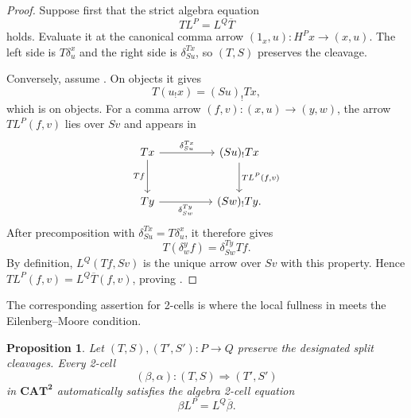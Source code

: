 \documentclass[11pt]{article}
\theoremstyle{plain}
\newtheorem{proposition}[theorem]{Proposition}
\theoremstyle{definition}
\theoremstyle{remark}
\newcommand{\CAT}{\mathbf{CAT}}
\numberwithin{equation}{section}
\begin{document}
\begin{proof}
Suppose first that the strict algebra equation
\begin{equation}
TL^{P}=L^{Q}\overline T
  \label{eq:TL-equality}
\end{equation}
holds.  Evaluate it at the canonical comma arrow
$(1_x,u)\colon H^{P}x\to(x,u)$.  The left side is
$T\delta^{x}_{u}$ and the right side is
$\delta^{Tx}_{Su}$, so $(T,S)$ preserves the cleavage.

Conversely, assume .  On objects it
gives
\begin{equation*}
T(u_{!}x)=(Su)_{!}Tx,
\end{equation*}
which is  on objects.  For a comma arrow
$(f,v)\colon(x,u)\to(y,w)$, the arrow $TL^{P}(f,v)$ lies over $Sv$
and appears in
\begin{equation*}
\begin{tikzcd}[column sep=huge,row sep=large]
Tx \arrow[r,"\delta^{Tx}_{Su}"] \arrow[d,"Tf"']
& (Su)_!Tx \arrow[d,"{TL^P(f,v)}"] \\
Ty \arrow[r,"\delta^{Ty}_{Sw}"']
& (Sw)_!Ty .
\end{tikzcd}
\end{equation*}
After precomposition with $\delta^{Tx}_{Su}=T\delta^{x}_{u}$, it
therefore gives
\begin{equation*}
T(\delta^{y}_{w}f)=\delta^{Ty}_{Sw}Tf.
\end{equation*}
By definition, $L^{Q}(Tf,Sv)$ is the unique arrow over $Sv$ with
this property.  Hence $TL^{P}(f,v)=L^{Q}\overline T(f,v)$, proving
.
\end{proof}

The corresponding assertion for 2-cells is where the local fullness
in  meets the Eilenberg--Moore condition.

\begin{proposition}\label{prop:two-cells}
Let $(T,S),(T',S')\colon P\to Q$ preserve the designated split
cleavages.  Every 2-cell
\begin{equation*}
(\beta,\alpha)\colon(T,S)\Rightarrow(T',S')
\end{equation*}
in $\CAT^{\mathbf 2}$ automatically satisfies the algebra 2-cell
equation
\begin{equation}
\beta L^{P}=L^{Q}\overline\beta.
  \label{eq:auto-algebra-2cell}
\end{equation}
\end{proposition}
\end{document}
